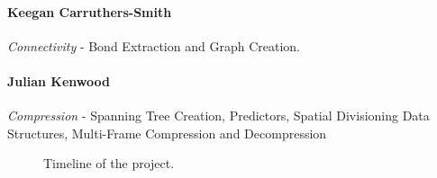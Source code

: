 \documentclass[a4paper,twocolumn]{article}
\begin{document}
\paragraph{Keegan Carruthers-Smith} \emph{Connectivity} - Bond Extraction and Graph
Creation.
\paragraph{Julian Kenwood} \emph{Compression} - Spanning Tree Creation,
Predictors, Spatial Divisioning Data Structures, Multi-Frame Compression and Decompression




\begin{figure}[!h]
\centering
{}
\caption{Timeline of the project.}
\label{fig:timeline}
\end{figure}
\end{document}
